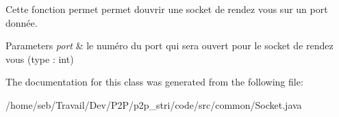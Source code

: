 Cette fonction permet permet d\textquotesingle{}ouvrir une socket de rendez vous sur un port donnée. 


\begin{DoxyParams}{Parameters}
{\em port} & le numéro du port qui sera ouvert pour le socket de rendez vous (type \+: int) \\
\hline
\end{DoxyParams}


The documentation for this class was generated from the following file\+:\begin{DoxyCompactItemize}
\item 
/home/seb/\+Travail/\+Dev/\+P2\+P/p2p\+\_\+stri/code/src/common/Socket.\+java\end{DoxyCompactItemize}
